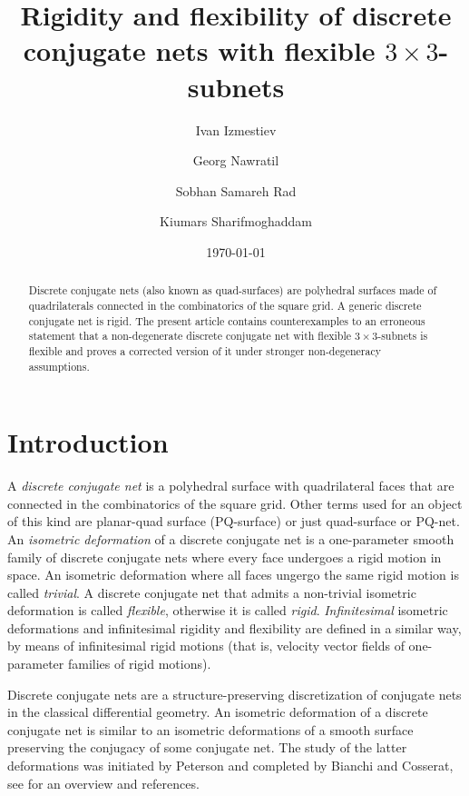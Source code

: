 \documentclass{amsart}
\title{Rigidity and flexibility of discrete conjugate nets with flexible $3 \times 3$-subnets}
\author{Ivan Izmestiev}
\author{Georg Nawratil}
\author{Sobhan Samareh Rad}
\author{Kiumars Sharifmoghaddam}
\date{\today}
\theoremstyle{definition}
\newcommand\RR{\mathbb{R}}
\begin{document}
\begin{abstract}
Discrete conjugate nets (also known as quad-surfaces) are polyhedral surfaces made of quadrilaterals connected in the combinatorics of the square grid.
A generic discrete conjugate net is rigid.
The present article contains counterexamples to an erroneous statement that a non-degenerate discrete conjugate net with flexible $3 \times 3$-subnets is flexible and proves a corrected version of it under stronger non-degeneracy assumptions.
\end{abstract}

\maketitle


\section{Introduction}
A \emph{discrete conjugate net} is a polyhedral surface with quadrilateral faces that are connected in the combinatorics of the square grid.
Other terms used for an object of this kind are planar-quad surface (PQ-surface) or just quad-surface or PQ-net.
An \emph{isometric deformation} of a discrete conjugate net is a one-parameter smooth family of discrete conjugate nets where every face undergoes a rigid motion in space.
An isometric deformation where all faces ungergo the same rigid motion is called \emph{trivial}.
A discrete conjugate net that admits a non-trivial isometric deformation is called \emph{flexible}, otherwise it is called \emph{rigid}.
\emph{Infinitesimal} isometric deformations and infinitesimal rigidity and flexibility are defined in a similar way, by means of infinitesimal rigid motions (that is, velocity vector fields of one-parameter families of rigid motions).

Discrete conjugate nets are a structure-preserving discretization of conjugate nets in the classical differential geometry.
An isometric deformation of a discrete conjugate net is similar to an isometric deformations of a smooth surface preserving the conjugacy of some conjugate net.
The study of the latter deformations was initiated by Peterson and completed by Bianchi and Cosserat, see \cite{Finikoff1937, Finikoff1939} for an overview and references.

\end{document}
